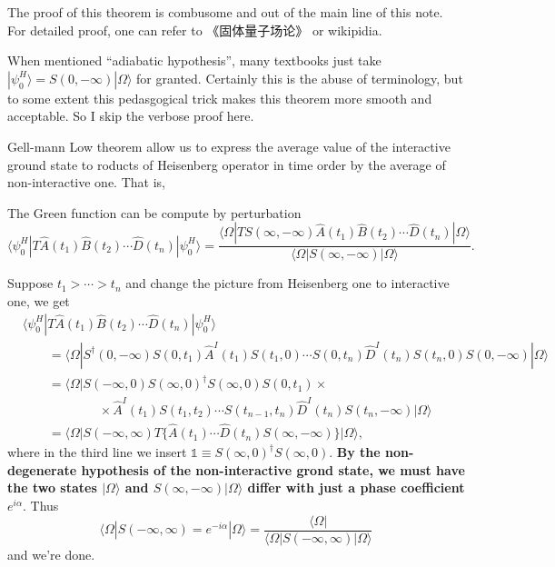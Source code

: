 \documentclass[b5paper,10pt,UTF8]{book}
\numberwithin{equation}{section}
\begin{document}
		\begin{Proof}
			The proof of this theorem is combusome and out of the main line of this note. For detailed proof, one can refer to 《固体量子场论》 or wikipidia.
		\end{Proof}
		\begin{Note}
			When mentioned ``adiabatic hypothesis'', many textbooks just take $|\psi_0^H\rangle=S(0,-\infty)|\Omega\rangle$ for granted. Certainly this is the abuse of terminology, but to some extent this pedasgogical trick makes this theorem more smooth and acceptable. So I skip the verbose proof here. 
		\end{Note}
		Gell-mann Low theorem allow us to express the average value of the interactive ground state to roducts of Heisenberg operator in time order by the average of non-interactive one. That is, 
		\begin{Theorem}
			The Green function can be compute by perturbation
			\begin{equation}\label{2.6.3}
				\langle\psi_0^H|T\hat{A}(t_1)\hat{B}(t_2)\cdots \hat{D}(t_n)|\psi^H_0\rangle=\dfrac{\langle\Omega|TS(\infty,-\infty)\hat{A}(t_1)\hat{B}(t_2)\cdots \hat{D}(t_n)|\Omega\rangle}{\langle\Omega|S(\infty,-\infty)|\Omega\rangle}.
			\end{equation}
		\end{Theorem}
		\begin{Proof}
			Suppose $t_1>\cdots>t_n$ and change the picture from Heisenberg one to interactive one, we get
			\begin{align*}
				&\langle\psi_0^H|T\hat{A}(t_1)\hat{B}(t_2)\cdots \hat{D}(t_n)|\psi^H_0\rangle\\
				&\qquad=\langle\Omega|S^\dagger(0,-\infty)S(0,t_1)\hat{A}^I(t_1)S(t_1,0)\cdots S(0,t_n)\hat{D}^I(t_n)S(t_n,0) S(0,-\infty)|\Omega\rangle\\
				&\qquad=\langle\Omega|S(-\infty,0) S(\infty,0)^\dagger S(\infty,0)S(0,t_1)\times\\
				&\qquad\qquad\qquad\times\hat{A}^I(t_1)S(t_1,t_2)\cdots S(t_{n-1},t_n)\hat{D}^I(t_n)S(t_n,-\infty)|\Omega\rangle\\
				&\qquad=\bigg\langle\Omega\bigg|S(-\infty,\infty) T\bigg\{\hat{A}(t_1)\cdots \hat{D}(t_n)S(\infty,-\infty)\bigg\}\bigg|\Omega\bigg\rangle,
			\end{align*}
			where in the third line we insert $\mathbb{1}\equiv S(\infty,0)^\dagger S(\infty,0)$. \textbf{By the non-degenerate hypothesis of the non-interactive grond state, we must have the two states $|\Omega\rangle$ and $S(\infty,-\infty)|\Omega\rangle$ differ with just a phase coefficient $e^{i\alpha}$}. Thus
			$$\langle\Omega|S(-\infty,\infty)=e^{-i\alpha}|\Omega\rangle=\dfrac{\langle\Omega|}{\langle\Omega|S(-\infty,\infty)|\Omega\rangle}$$
			and we're done.
		\end{Proof}
\end{document}
